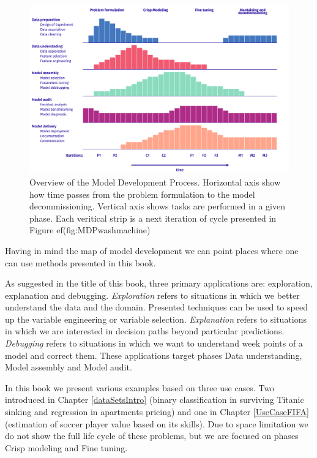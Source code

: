\documentclass[12pt,]{krantz}
\begin{document}
\begin{figure}

{\centering \includegraphics[width=0.99\linewidth]{figure/mdp_general} 

}

\caption{Overview of the Model Development Process. Horizontal axis show how time passes from the problem formulation to the model decommissioning. Vertical axis shows tasks are performed in a given phase. Each veritical strip is a next iteration of cycle presented in Figure 
ef(fig:MDPwashmachine)}\label{fig:mdpGeneral}
\end{figure}

Having in mind the map of model development we can point places where one can use methods presented in this book.

As suggested in the title of this book, three primary applications are: exploration, explanation and debugging. \emph{Exploration} refers to situations in which we better understand the data and the domain. Presented techniques can be used to speed up the variable engineering or variable selection. \emph{Explanation} refers to situations in which we are interested in decision paths beyond particular predictions. \emph{Debugging} refers to situations in which we want to understand week points of a model and correct them. These applications target phases Data understanding, Model assembly and Model audit.

In this book we present various examples based on three use cases. Two introduced in Chapter \ref{dataSetsIntro} (binary classification in surviving Titanic sinking and regression in apartments pricing) and one in Chapter \ref{UseCaseFIFA} (estimation of soccer player value based on its skills). Due to space limitation we do not show the full life cycle of these problems, but we are focused on phases Crisp modeling and Fine tuning.
\end{document}
